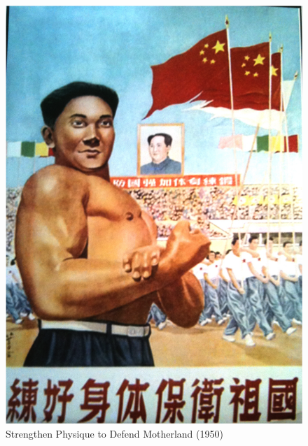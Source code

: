 \begin{CJK}{UTF8}{gbsn}
 \begin{figure}[htbp]
   \includegraphics[width = \linewidth,scale=.7]{images/motherlandStrength.png}
   \caption{Strengthen Physique to Defend Motherland (1950)}
   \label{fig:motherlandStrength}
 \end{figure}


\end{CJK}
